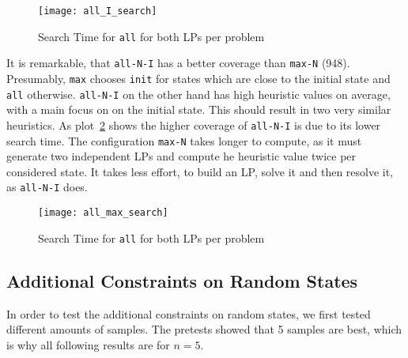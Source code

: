 \begin{figure}[h!]
\centering
    \texttt{[image: all\_I\_search]}
    \caption{Search Time  for \texttt{all} for both LPs per problem}
    \label{fig:search_all}
\end{figure}

It is remarkable, that \texttt{all-N-I} has a better coverage than \texttt{max-N} (948).
Presumably, \texttt{max} chooses \texttt{init} for states which are close to the initial state and \texttt{all} otherwise.
\texttt{all-N-I} on the other hand has high heuristic values on average, with a main focus on on the initial state.
This should result in two very similar heuristics.
As plot~\ref{fig:search_max_all} shows the higher coverage of \texttt{all-N-I} is due to its lower search time.
The configuration \texttt{max-N} takes longer to compute, as it must generate two independent LPs and compute he heuristic value twice per considered state.
It takes less effort, to build an LP, solve it and then resolve it, as \texttt{all-N-I} does.

\begin{figure}[h!]
\centering
    \texttt{[image: all\_max\_search]}
    \caption{Search Time  for \texttt{all} for both LPs per problem}
    \label{fig:search_max_all}
\end{figure}
\newpage

\subsection{Additional Constraints on Random States}\label{subsec:additional-constraint-on-random-states}
In order to test the additional constraints on random states, we first tested different amounts of samples.
The pretests showed that 5 samples are best, which is why all following results are for $n=5$.


